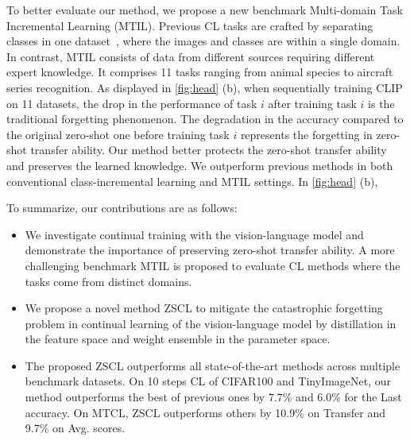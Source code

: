 To better evaluate our method, we propose a new benchmark Multi-domain Task Incremental Learning (MTIL). Previous CL tasks are crafted by separating classes in one dataset~\cite{douillard2022dytox,yan2021dynamically,zhu2021prototype}, where the images and classes are within a single domain. In contrast, MTIL consists of data from different sources requiring different expert knowledge. It comprises 11 tasks ranging from animal species to aircraft series recognition. As displayed in \cref{fig:head} (b), when sequentially training CLIP on 11 datasets, the drop in the performance of task $i$ after training task $i$ is the traditional forgetting phenomenon. The degradation in the accuracy compared to the original zero-shot one before training task $i$ represents the forgetting in zero-shot transfer ability. Our method better protects the zero-shot transfer ability and preserves the learned knowledge. We outperform previous methods in both conventional class-incremental learning and MTIL settings.
In \cref{fig:head} (b), 

To summarize, our contributions are as follows:
\begin{itemize}
    \item We investigate continual training with the vision-language model and demonstrate the importance of preserving zero-shot transfer ability. A more challenging benchmark MTIL is proposed to evaluate CL methods where the tasks come from distinct domains.
    \item We propose a novel method ZSCL to mitigate the catastrophic forgetting problem in continual learning of the vision-language model by distillation in the feature space and weight ensemble in the parameter space. 
    \item The proposed ZSCL outperforms all state-of-the-art methods across multiple benchmark datasets. On 10 steps CL of CIFAR100 and TinyImageNet, our method outperforms the best of previous ones by 7.7\% and 6.0\% for the Last accuracy. On MTCL, ZSCL outperforms others by 10.9\% on Transfer and 9.7\% on Avg. scores.
\end{itemize}